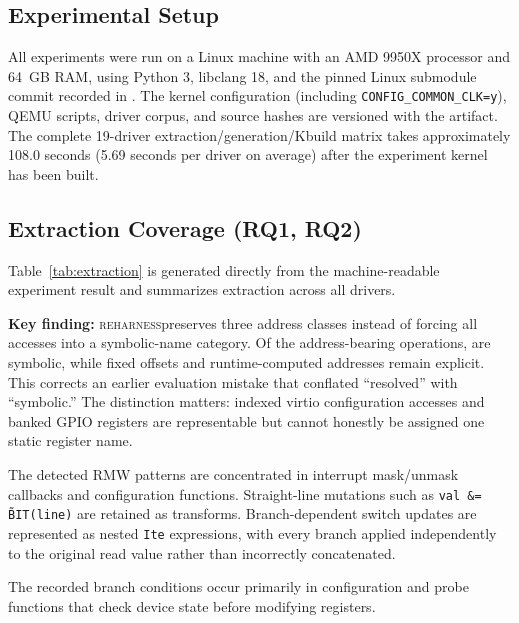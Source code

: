 \documentclass[sigconf,review]{acmart}
\newcommand{\reharness}{\textsc{reharness}}
\begin{document}
\subsection{Experimental Setup}

All experiments were run on a Linux machine with an AMD 9950X processor and 64~GB RAM, using Python 3, libclang 18, and the pinned Linux submodule commit recorded in . The kernel configuration (including \texttt{CONFIG\_COMMON\_CLK=y}), QEMU scripts, driver corpus, and source hashes are versioned with the artifact. The complete 19-driver extraction/generation/Kbuild matrix takes approximately 108.0 seconds (5.69 seconds per driver on average) after the experiment kernel has been built.

\subsection{Extraction Coverage (RQ1, RQ2)}

Table~\ref{tab:extraction} is generated directly from the machine-readable experiment result and summarizes extraction across all \EvalDrivers{} drivers.

\begin{table}[t]
\centering
\caption{Extraction statistics across \EvalDrivers{} test drivers. Sym, Fixed, and Comp are distinct address classes.}
\label{tab:extraction}
\resizebox{\columnwidth}{!}{\ExtractionResultsTable}
\end{table}

\textbf{Key finding:} \reharness preserves three address classes instead of forcing all accesses into a symbolic-name category. Of the address-bearing operations, \EvalSymbolicPct{} are symbolic, while fixed offsets and runtime-computed addresses remain explicit. This corrects an earlier evaluation mistake that conflated ``resolved'' with ``symbolic.'' The distinction matters: indexed virtio configuration accesses and banked GPIO registers are representable but cannot honestly be assigned one static register name.

The \EvalRMW{} detected RMW patterns are concentrated in interrupt mask/unmask callbacks and configuration functions. Straight-line mutations such as \texttt{val \&= \~BIT(line)} are retained as transforms. Branch-dependent switch updates are represented as nested \texttt{Ite} expressions, with every branch applied independently to the original read value rather than incorrectly concatenated.

The \EvalConditions{} recorded branch conditions occur primarily in configuration and probe functions that check device state before modifying registers.
\end{document}
